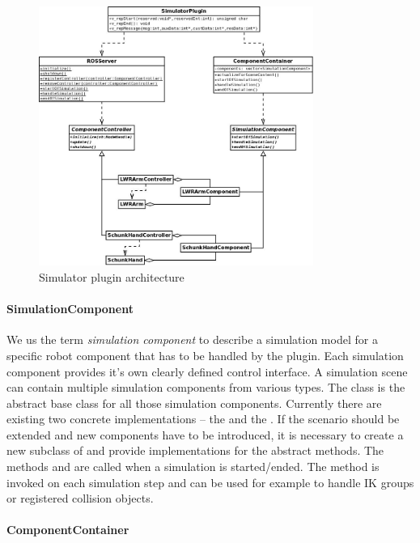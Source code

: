 \begin{figure}
	\centering
  	\includegraphics[width=0.8\textwidth]{images/SimulatorPluginUML.jpg}
	\caption{Simulator plugin architecture}
	\label{fig:plugin_uml}
\end{figure}

\paragraph{SimulationComponent}

We us the term \emph{simulation component} to describe a simulation model for a specific robot component that has to be handled by the plugin. Each simulation component provides it's own clearly defined control interface. A simulation scene can contain multiple simulation components from various types. The  class is the abstract base class for all those simulation components. Currently there are existing two concrete implementations -- the  and the . If the scenario should be extended and new components have to be introduced, it is necessary to create a new subclass of  and provide implementations for the abstract methods. The methods  and  are called when a simulation is started/ended. The method  is invoked on each simulation step and can be used for example to handle IK groups or registered collision objects.

\paragraph{ComponentContainer}

